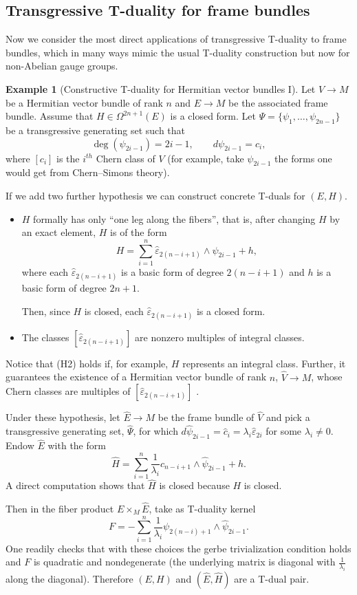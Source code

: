 \documentclass[12pt,twoside]{article}
\theoremstyle{plain}
\theoremstyle{definition}
\newtheorem{example}[theorem]{Example}
\numberwithin{equation}{section}
\begin{document}
\subsection{Transgressive T-duality for frame bundles}

Now we consider the most direct applications of transgressive T-duality to frame bundles, which in many ways mimic the usual T-duality construction but now for non-Abelian gauge groups.
\begin{example}[Constructive T-duality for Hermitian vector bundles I]\label{ex:constructive 1}   Let $V\to M$ be a Hermitian vector bundle of rank $n$ and $E\to M$ be the associated frame bundle. Assume that $H \in \Omega^{2n+1}(E)$ is a closed form. Let $\Psi = \{\psi_1,\dots,\psi_{2n-1}\}$ be a transgressive generating set such that
\[\deg(\psi_{2i-1}) = 2i-1, \qquad d\psi_{2i-1} = c_i,\]
where $[c_i]$ is the $i^{th}$ Chern class of $V$ (for example, take $\psi_{2i-1}$ the forms one would get from Chern--Simons theory).

If we add two further hypothesis we can construct concrete T-duals for $(E,H)$.
\begin{itemize}
\item[(H1)] $H$ formally has only ``one leg along the fibers'', that is, after changing $H$ by an exact element, $H$ is of the form
\[H = \sum_{i=1}^n \hat{\varepsilon}_{2(n-i+1)} \wedge \psi_{2i-1} + h,\]
where each $\hat{\varepsilon}_{2(n-i+1)}$ is a basic form of degree $2(n-i+1)$ and $h$ is a basic form of degree $2n+1$.

Then, since $H$ is closed, each $\hat{\varepsilon}_{2(n-i+1)}$ is a closed form.
\item[(H2)] The classes $[\hat{\varepsilon}_{2(n-i+1)}]$ are nonzero multiples of integral classes.
\end{itemize}
Notice that (H2) holds if, for example, $H$ represents an integral class. Further, it guarantees the existence of a Hermitian vector bundle of rank $n$, $\hat{V} \to M$, whose Chern classes are multiples of $[\hat{\varepsilon}_{2(n-i+1)}]$ \cite{BV03}.

Under these hypothesis, let $\hat{E}\to M$ be the frame bundle of $\hat{V}$ and pick a transgressive generating set, $\hat{\Psi}$, for which $d\hat{\psi}_{2i-1} = \hat{c}_i = \lambda_i \hat \varepsilon_{2i}$ for some $\lambda_i \neq 0$. Endow $\hat{E}$ with the form
\[\hat{H} = \sum_{i=1}^n \frac{1}{\lambda_i}c_{n-i+1} \wedge \hat{\psi}_{2i-1} + h.\]
A direct computation shows that $\hat{H}$ is closed because $H$ is closed.

Then in the fiber product $E \times_M \hat{E}$, take as T-duality kernel
\[F = -\sum_{i=1}^{n}\frac{1}{\lambda_i}\psi_{2(n-i)+1} \wedge \hat{\psi}_{2i-1}.\]
One readily checks that  with these choices the gerbe trivialization condition holds and $F$ is quadratic and nondegenerate (the underlying matrix is diagonal with $\frac{1}{\lambda_i}$ along the diagonal). Therefore $(E,H)$ and $(\hat{E},\hat{H})$ are a T-dual pair.
\end{example}
\end{document}
